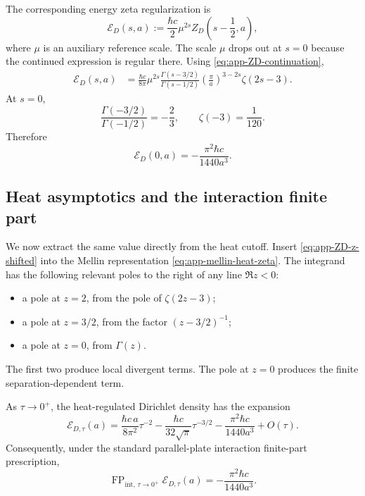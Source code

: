 \documentclass[11pt]{article}
\providecommand{\hbarc}{\hbar c}
\providecommand{\FP}{\operatorname{FP}}
\providecommand{\paren}[1]{\left(#1\right)}
\numberwithin{equation}{section}
\begin{document}
The corresponding energy zeta regularization is
\begin{equation}
\label{eq:app-energy-zeta-def}
    \mathcal E_D(s,a)
    :=
    \frac{\hbarc}{2}\mu^{2s} Z_D\paren{s-\frac12,a},
\end{equation}
where \(\mu\) is an auxiliary reference scale.  The scale \(\mu\) drops out at
\(s=0\) because the continued expression is regular there.  Using
\eqref{eq:app-ZD-continuation},
\begin{align}
\label{eq:app-energy-zeta-evaluated}
    \mathcal E_D(s,a)
    &=
    \frac{\hbarc}{8\pi}
    \mu^{2s}
    \frac{\Gamma(s-3/2)}{\Gamma(s-1/2)}
    \paren{\frac{\pi}{a}}^{3-2s}
    \zeta(2s-3).
\end{align}
At \(s=0\),
\begin{equation}
\label{eq:app-gamma-zeta-values}
    \frac{\Gamma(-3/2)}{\Gamma(-1/2)}=-\frac23,
    \qquad
    \zeta(-3)=\frac{1}{120}.
\end{equation}
Therefore
\begin{equation}
\label{eq:app-zeta-dirichlet-result}
    \mathcal E_D(0,a)
    =
    -\frac{\pi^2\hbarc}{1440a^3}.
\end{equation}

\subsection{Heat asymptotics and the interaction finite part}
\label{subsec:app-heat-asymptotics}

We now extract the same value directly from the heat cutoff.  Insert
\eqref{eq:app-ZD-z-shifted} into the Mellin representation
\eqref{eq:app-mellin-heat-zeta}.  The integrand has the following relevant
poles to the right of any line \(\Re z<0\):
\begin{itemize}
    \item a pole at \(z=2\), from the pole of \(\zeta(2z-3)\);
    \item a pole at \(z=3/2\), from the factor \((z-3/2)^{-1}\);
    \item a pole at \(z=0\), from \(\Gamma(z)\).
\end{itemize}
The first two produce local divergent terms.  The pole at \(z=0\) produces
the finite separation-dependent term.

\begin{proposition}
\label{prop:app-dirichlet-heat-expansion}
As \(\tau\to0^+\), the heat-regulated Dirichlet density has the expansion
\begin{equation}
\label{eq:app-dirichlet-heat-expansion}
    \mathcal E_{D,\tau}(a)
    =
    \frac{\hbarc\,a}{8\pi^2}\tau^{-2}
    -
    \frac{\hbarc}{32\sqrt\pi}\tau^{-3/2}
    -
    \frac{\pi^2\hbarc}{1440a^3}
    +
    O(\tau).
\end{equation}
Consequently, under the standard parallel-plate interaction finite-part
prescription,
\begin{equation}
\label{eq:app-heat-FP-Dirichlet-result}
    \FP_{\mathrm{int},\,\tau\to0^+}\mathcal E_{D,\tau}(a)
    =
    -\frac{\pi^2\hbarc}{1440a^3}.
\end{equation}
\end{proposition}
\end{document}
